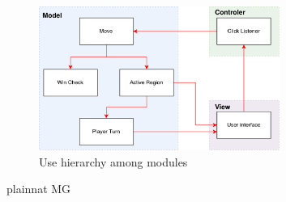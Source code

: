 \documentclass[12pt, titlepage]{article}
\begin{document}
\begin{figure}[H]
\centering
\includegraphics[width=0.7\textwidth]{UseHierarchy_Diagram.pdf}
\caption{Use hierarchy among modules}
\label{FigUH}
\end{figure}


 {plainnat}
 {MG}
\end{document}
